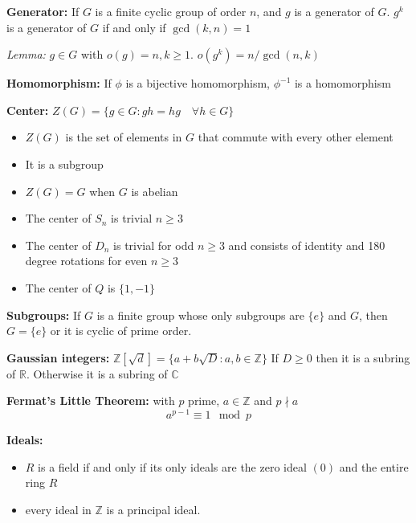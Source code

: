 \documentclass[12pt]{article}
\newcommand{\R}{\mathbb{R}}
\newcommand{\Z}{\mathbb{Z}}
\begin{document}
\textbf{Generator:} If $G$ is a finite cyclic group of order $n$, and $g$ is a generator of $G$. $g^k$ is a generator of $G$ if and only if $\gcd(k, n) = 1$

\emph{Lemma:} $g\in G$ with $o(g) = n, k \geq 1$. $o(g^k) = n/\gcd(n, k)$

\textbf{Homomorphism:} If $\phi$ is a bijective homomorphism, $\phi^{-1}$ is a homomorphism 

\textbf{Center:} $Z(G) = \{g \in G: gh = hg \quad \forall h \in G\}$
\begin{itemize}
    \item $Z(G)$ is the set of elements in $G$ that commute with every other element
    \item It is a subgroup 
    \item $Z(G) = G$ when $G$ is abelian 
    \item The center of $S_n$ is trivial $n \geq 3$
    \item The center of $D_n$ is trivial for odd $n \geq 3$ and consists of identity and 180 degree rotations for even $n \geq 3$
    \item The center of $Q$ is $\{1, -1\}$
\end{itemize}

\textbf{Subgroups:} If $G$ is a finite group whose only subgroups are $\{e\}$ and $G$, then $G = \{e\}$ or it is cyclic of prime order. 

\textbf{Gaussian integers:} $\Z[\sqrt d] = \{a + b\sqrt D: a, b \in \Z\}$ If $D \geq 0$ then it is a subring of $\R$. Otherwise it is a subring of $\mathbb C$

\textbf{Fermat's Little Theorem:} with $p$ prime, $a \in \Z$ and $p \nmid a$
\[a^{p-1} \equiv 1 \mod p\]

\textbf{Ideals:}
\begin{itemize}
    \item $R$ is a field if and only if its only ideals are the zero ideal $(0)$ and the entire ring $R$
    \item every ideal in $\Z$ is a principal ideal.
\end{itemize}
\end{document}
